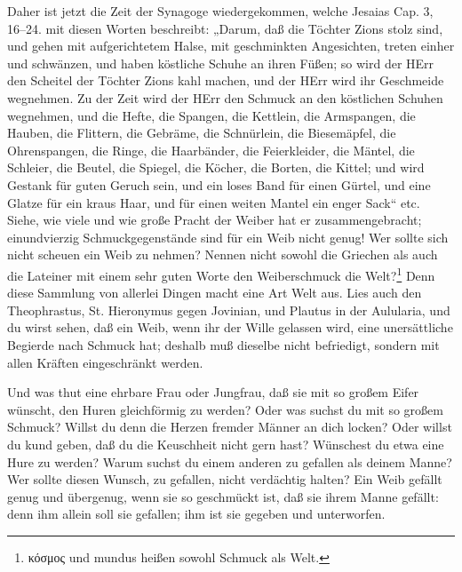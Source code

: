 Daher ist jetzt die Zeit der Synagoge wiedergekommen, welche Jesaias Cap. 3, 16–24. mit diesen Worten beschreibt: „Darum, daß die Töchter Zions stolz sind, und gehen mit aufgerichtetem Halse, mit geschminkten Angesichten, treten einher und schwänzen, und haben köstliche Schuhe an ihren Füßen; so wird der HErr den Scheitel der Töchter Zions kahl machen, und der HErr wird ihr Geschmeide wegnehmen. Zu der Zeit wird der HErr den Schmuck an den köstlichen Schuhen wegnehmen, und die Hefte, die Spangen, die Kettlein, die Armspangen, die Hauben, die Flittern, die Gebräme, die Schnürlein, die Biesemäpfel, die Ohrenspangen, die Ringe, die Haarbänder, die Feierkleider, die Mäntel, die Schleier, die Beutel, die Spiegel, die Köcher, die Borten, die Kittel; und wird Gestank für guten Geruch sein, und ein loses Band für einen Gürtel, und eine Glatze für ein kraus Haar, und für einen weiten Mantel ein enger Sack“ etc. Siehe, wie viele und wie große Pracht der Weiber hat er zusammengebracht; einundvierzig Schmuckgegenstände sind für ein Weib nicht genug! Wer sollte sich nicht scheuen ein Weib zu nehmen? Nennen nicht sowohl die Griechen als auch die Lateiner mit einem sehr guten Worte den Weiberschmuck die Welt?\footnote{κόσμος und mundus heißen sowohl Schmuck als Welt.} Denn diese Sammlung von allerlei Dingen macht eine Art Welt aus. Lies auch den Theophrastus, St. Hieronymus gegen Jovinian, und Plautus in der Aulularia, und du wirst sehen, daß ein Weib, wenn ihr der Wille gelassen wird, eine unersättliche Begierde nach Schmuck hat; deshalb muß dieselbe nicht befriedigt, sondern mit allen Kräften eingeschränkt werden.

Und was thut eine ehrbare Frau oder Jungfrau, daß sie mit so großem Eifer wünscht, den Huren gleichförmig zu werden? Oder was suchst du mit so großem Schmuck? Willst du denn die Herzen fremder Männer an dich locken? Oder willst du kund geben, daß du die Keuschheit nicht gern hast? Wünschest du etwa eine Hure zu werden? Warum suchst du einem anderen zu gefallen als deinem Manne? Wer sollte diesen Wunsch, zu gefallen, nicht verdächtig halten? Ein Weib gefällt genug und übergenug, wenn sie so geschmückt ist, daß sie ihrem Manne gefällt: denn ihm allein soll sie gefallen; ihm ist sie gegeben und unterworfen.

